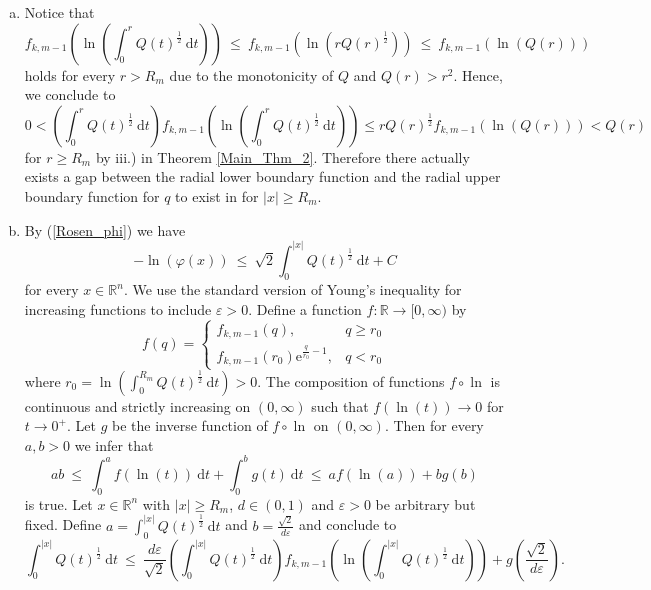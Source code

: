 \documentclass[12pt,longbibliography]{article}
\def\R{\mathbb{R}}
\theoremstyle{definition}
\theoremstyle{remark}
\theoremstyle{example}
\begin{document}
\begin{enumerate}[a)]

\item Notice that
$$
f_{k,m-1} \left( \ln\left( \int_{0}^{r} Q(t)^{\frac{1}{2}} \ \mathrm{d}t \right) \right) \ \leq \ 
f_{k,m-1} \left( \ln\left( rQ(r)^{\frac{1}{2}} \right) \right) \ \leq \ f_{k,m-1} \left( \ln\left( Q(r) \right) \right)
$$
holds for every $r > R_{m}$ due to the monotonicity of $Q$ and $Q(r) > r^{2}$. Hence, we conclude to
$$
0 < \left( \int_{0}^{r} Q(t)^{\frac{1}{2}} \ \mathrm{d}t \right) 
f_{k,m-1} \left( \ln\left( \int_{0}^{r} Q(t)^{\frac{1}{2}} \ \mathrm{d}t \right) \right)
 \leq 
 r Q(r)^{\frac{1}{2}} f_{k,m-1} \left( \ln\left( Q(r) \right) \right)  <  Q(r)
$$
for $r \geq R_{m}$ by iii.) in Theorem \ref{Main_Thm_2}. Therefore there actually exists a gap between the radial
lower boundary function and the radial upper boundary function for $q$ to exist in for $|x| \geq R_{m}$.

\item By (\ref{Rosen_phi}) we have 
$$
-\ln \left( \varphi(x) \right) \ \leq \ \sqrt{2} \int_{0}^{|x|} Q(t)^{\frac{1}{2}} \ \mathrm{d}t + C
$$
for every $x \in \R^{n}$. We use the standard version of Young's inequality for increasing functions to include 
$\varepsilon > 0$. Define a function $f \colon \R \to [0,\infty)$ by
$$
f(q)=\left\{\begin{array}{ll} 
	f_{k,m-1}(q), & q \geq r_{0} \\
         f_{k,m-1}\left( r_{0} \right)\mathrm{e}^{\frac{q}{r_{0}}-1}, & q < r_{0}
\end{array}\right. 
$$
where $r_{0} = \ln \left( \int_{0}^{R_{m}} Q(t)^{\frac{1}{2}} \ \mathrm{d}t \right) > 0$. 
The composition of functions $f \circ \ln$ is continuous and strictly increasing on $(0,\infty)$ such that 
$f \left( \ln(t) \right) \to 0$ for $t \to 0^{+}$. Let $g$ be the inverse function of $f \circ \ln$  on $(0,\infty)$. 
Then for every $a,b > 0$ we infer that
$$
ab \ \leq \ \int_{0}^{a} f \left( \ln(t) \right) \ \mathrm{d}t + \int_{0}^{b} g(t)  \ \mathrm{d}t \ \leq \ a f \left( \ln(a) \right) + b g(b)
$$
is true. Let $x \in \R^{n}$ with $|x| \geq R_{m}$, $d \in (0,1)$ and $\varepsilon > 0$ be arbitrary but fixed. Define 
$a =  \int_{0}^{|x|} Q(t)^{\frac{1}{2}} \ \mathrm{d}t$ and $b = \frac{\sqrt{2}}{d \varepsilon}$ and conclude to
$$
\int_{0}^{|x|} Q(t)^{\frac{1}{2}} \ \mathrm{d}t \ \leq \ \frac{d \varepsilon}{\sqrt{2}} 
\left( \int_{0}^{|x|} Q(t)^{\frac{1}{2}} \ \mathrm{d}t \right)
f_{k,m-1} \left( \ln\left( \int_{0}^{|x|} Q(t)^{\frac{1}{2}} \ \mathrm{d}t \right) \right) + g\left( \frac{\sqrt{2}}{d \varepsilon} \right).
$$


\end{enumerate}
\end{document}
